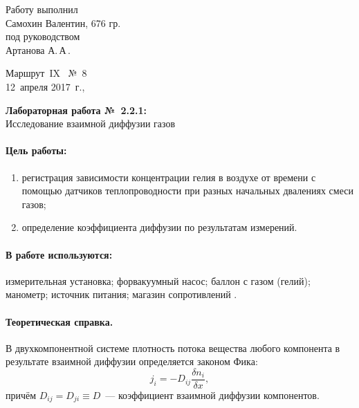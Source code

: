 \documentclass[12pt]{article}
\begin{document}
	\begin{minipage}{0.45\linewidth}
	Работу выполнил\\
	Самохин Валентин, 676 гр.\\[2mm]
	под руководством\\
	Артанова А.\,А\,.
	\end{minipage}
	\hfill
	\begin{minipage}{0.45\linewidth}\flushright
		Маршрут~IX \ №~8\\[3mm]
		12~апреля 2017~г.,\\
		\end{minipage}
		
		\vspace{8mm}
		\begin{center}
			\textbf{\Large Лабораторная работа №~2.2.1:}\\[\parskip]
			\LARGE Исследование взаимной диффузии газов
			\end{center}
			\vspace{0mm}
			
			\paragraph{Цель работы:}
			\begin{enumerate}
				\item регистрация зависимости концентрации гелия в воздухе от времени с помощью датчиков теплопроводности при разных начальных двалениях смеси газов;
				\item определение коэффициента диффузии по результатам измерений.
			\end{enumerate}
			
			\paragraph{В работе используются:}
			измерительная установка; форвакуумный насос; баллон с газом (гелий); манометр; источник питания; магазин сопротивлений .
			
			
			\vspace{2\parskip}
		\paragraph{Теоретическая справка.}
		В двухкомпонентной системе плотность потока вещества любого компонента в
		результате взаимной диффузии определяется законом Фика:
		\begin{equation}
		j_i = -D_{ij} \dfrac{\delta n_i}{\delta x},
		\end{equation}
		причём $D_{ij} = D_{ji} \equiv D$~--- коэффициент взаимной диффузии
		компонентов.
		
\end{document}

